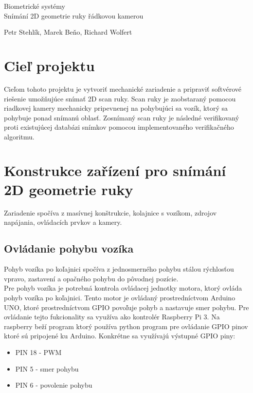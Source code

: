 \documentclass[11pt,a4paper]{article}
\begin{document}
\begin{center}
	\LARGE{Biometrické systémy}\\
	\Large{Snímání 2D geometrie ruky řádkovou kamerou}
	\vspace{0.5cm}

	Petr Stehlík, Marek Beňo, Richard Wolfert

	\vspace{0.2cm}

\end{center}

\section{Cieľ projektu}
Cieľom tohoto projektu je vytvoriť mechanické zariadenie a pripraviť softvérové riešenie umožňujúce snímať 2D scan ruky. Scan ruky je zaobstaraný pomocou riadkovej kamery mechanicky pripevnenej na pohybujúci sa vozík, ktorý sa pohybuje ponad snímanú oblasť. Zosnímaný scan ruky je následné verifikovaný proti existujúcej databázi snímkov pomocou implementovaného verifikačného algoritmu.

\section{Konstrukce zařízení pro snímání 2D geometrie ruky}
Zariadenie spočíva z masívnej konštrukcie, kolajnice s vozíkom, zdrojov napájania, ovládacích prvkov a kamery. 

\subsection{Ovládanie pohybu vozíka}
Pohyb vozíka po koľajnici spočíva z jednosmerného pohybu stálou rýchlosťou vpravo, zastavení a opačného pohybu do pôvodnej pozície. \\
Pre pohyb vozíka je potrebná kontrola ovládacej jednotky motora, ktorý ovláda pohyb vozíka po koľajnici. Tento motor je ovládaný prostredníctvom Arduino UNO, ktoré prostredníctvom GPIO povoľuje pohyb a nastavuje smer pohybu. Pre ovládanie tejto fukcionality sa využíva ako kontrolér Raspberry Pi 3. Na raspberry beží program ktorý používa python program pre ovládanie GPIO pinov ktoré sú pripojené ku Arduino. Konkrétne sa využívajú výstupné GPIO piny:
\begin{itemize}
    \item PIN 18 - PWM
    \item PIN  5 - smer pohybu
    \item PIN  6 - povolenie pohybu
\end{itemize}
\end{document}
